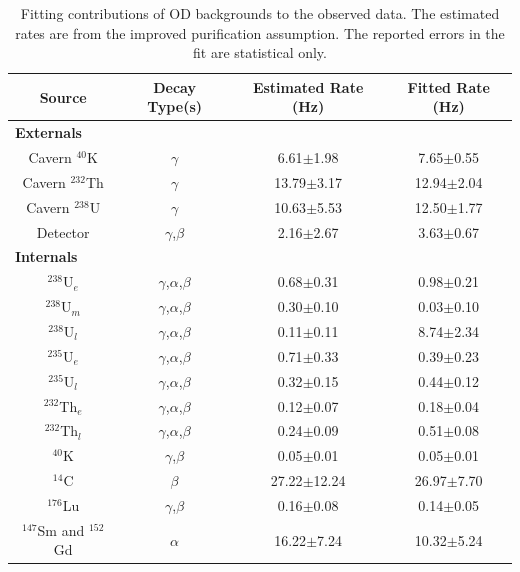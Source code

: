 \begin{table}[]
    \centering
    \begin{tabular}{c|c|c|c}
        Source               &  Decay Type(s)               & Estimated Rate (Hz) & Fitted Rate (Hz) \\ \hline
        \multicolumn{4}{l}{\textbf{Externals}} \\
        Cavern ${}^{40}$K    & $\gamma$                     & 6.61$\pm$1.98       & 7.65$\pm$0.55                    \\ 
        Cavern ${}^{232}$Th  & $\gamma$                     & 13.79$\pm$3.17      & 12.94$\pm$2.04                    \\ 
        Cavern ${}^{238}$U   & $\gamma$                     & 10.63$\pm$5.53      & 12.50$\pm$1.77                    \\ 
        Detector             & $\gamma$,$\beta$             & 2.16$\pm$2.67       & 3.63$\pm$0.67              \\ \hline
        \multicolumn{4}{l}{\textbf{Internals}} \\
        ${}^{238}$U$_{e}$     & $\gamma$,$\alpha$,$\beta$   & 0.68$\pm$0.31       & 0.98$\pm$0.21                    \\ 
        ${}^{238}$U$_{m}$     & $\gamma$,$\alpha$,$\beta$   & 0.30$\pm$0.10       & 0.03$\pm$0.10                   \\
        ${}^{238}$U$_{l}$     & $\gamma$,$\alpha$,$\beta$   & 0.11$\pm$0.11       & 8.74$\pm$2.34                \\
        ${}^{235}$U$_{e}$     & $\gamma$,$\alpha$,$\beta$   & 0.71$\pm$0.33       & 0.39$\pm$0.23                    \\
        ${}^{235}$U$_{l}$     & $\gamma$,$\alpha$,$\beta$   & 0.32$\pm$0.15       & 0.44$\pm$0.12                    \\
        ${}^{232}$Th$_{e}$    & $\gamma$,$\alpha$,$\beta$   & 0.12$\pm$0.07       & 0.18$\pm$0.04                    \\
        ${}^{232}$Th$_{l}$    & $\gamma$,$\alpha$,$\beta$   & 0.24$\pm$0.09       & 0.51$\pm$0.08                  \\
        ${}^{40}$K          & $\gamma$,$\beta$              & 0.05$\pm$0.01       & 0.05$\pm$0.01                 \\
        ${}^{14}$C          & $\beta$                       & 27.22$\pm$12.24     & 26.97$\pm$7.70           \\
        ${}^{176}$Lu        & $\gamma$,$\beta$              & 0.16$\pm$0.08       & 0.14$\pm$0.05               \\
        ${}^{147}$Sm and ${}^{152}$Gd    & $\alpha$         & 16.22$\pm$7.24      & 10.32$\pm$5.24                     
        
    \end{tabular}
    \caption{Fitting contributions of OD backgrounds to the observed data. 
             The estimated rates are from the improved purification assumption.
             The reported errors in the fit are statistical only.}
    \label{tab:od_fitted_background_rates}
\end{table}
